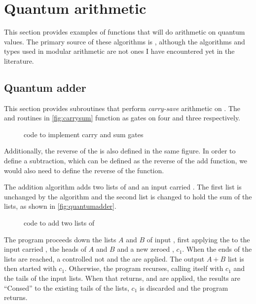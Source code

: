 \section{Quantum arithmetic}\label{sec:examplesArithmetic}
This section provides examples of functions that will do
arithmetic on quantum values. The primary source of these 
algorithms is \cite{Vedral:1995ga}, although the 
algorithms and types used in modular arithmetic are not ones
 I have encountered yet
in the literature.


\subsection{Quantum adder}\label{appsubsec:quantumadder}
This section provides subroutines that perform \emph{carry-save}
arithmetic on \qubits{}. The  and 
routines in \vref{fig:carrysum} function as gates on four \qubits{}
and three \qubits{} respectively. 


\begin{figure}[htbp]

\caption{\lqpl{} code to implement carry and sum gates}\label{fig:carrysum}
\end{figure}

Additionally, the reverse of the  is 
also defined in the same figure. In order to define a subtraction, 
which can be defined as the reverse of the add function, 
we would also need to define the reverse of the  function.

The addition algorithm adds two lists of \qubits{} and an input
carried \qubit. The first list
is unchanged by the algorithm and the second list is changed to hold the 
sum of the lists, as shown in \vref{fig:quantumadder}.

\begin{figure}[htbp]

\caption{\lqpl{} code to add two lists of \qubits}\label{fig:quantumadder}
\end{figure}

The program proceeds down the lists $A$ and $B$ of input \qubits, first applying
the  to the input carried \qubit, the heads of $A$ and $B$ and
a new zeroed \qubit, $c_1$. When the ends of the lists are reached, a controlled
not and the  are applied. The output $A+B$ list is then started
with $c_1$. Otherwise, the program recurses, calling itself
with $c_1$ and the tails of the input lists. When that returns, 
and  are applied, the results are ``Consed'' to the existing
tails of the lists, $c_1$ is discarded and the program returns.

